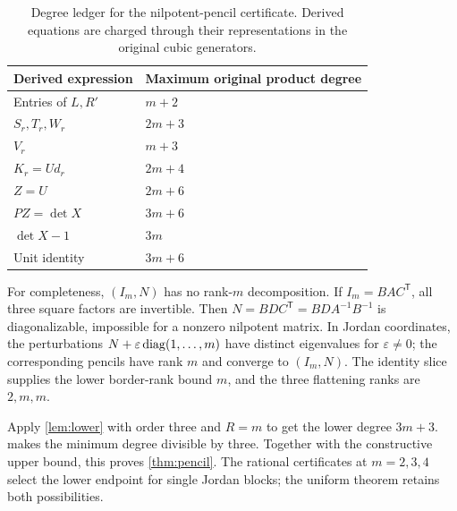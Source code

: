 \begin{table}[htbp]
\centering\small
\begin{tabular}{@{}ll@{}}
\toprule
Derived expression & Maximum original product degree \\
\midrule
Entries of $L,R'$ & $m+2$ \\
$S_r,T_r,W_r$ & $2m+3$ \\
$V_r$ & $m+3$ \\
$K_r=Ud_r$ & $2m+4$ \\
$Z=U$ & $2m+6$ \\
$PZ=\det X$ & $3m+6$ \\
$\det X-1$ & $3m$ \\
Unit identity & $3m+6$ \\
\bottomrule
\end{tabular}
\caption{Degree ledger for the nilpotent-pencil certificate. Derived equations are charged through their representations in the original cubic generators.}
\label{tab:degree-ledger}
\end{table}

For completeness, $(I_m,N)$ has no rank-$m$ decomposition. If $I_m=BAC^{\mathsf T}$, all three square factors are invertible. Then $N=BDC^{\mathsf T}=BDA^{-1}B^{-1}$ is diagonalizable, impossible for a nonzero nilpotent matrix. In Jordan coordinates, the perturbations $N+\varepsilon\operatorname{diag}(1,\ldots,m)$ have distinct eigenvalues for $\varepsilon\ne0$; the corresponding pencils have rank $m$ and converge to $(I_m,N)$. The identity slice supplies the lower border-rank bound $m$, and the three flattening ranks are $2,m,m$.

Apply \cref{lem:lower} with order three and $R=m$ to get the lower degree $3m+3$.  makes the minimum degree divisible by three. Together with the constructive upper bound, this proves \cref{thm:pencil}. The rational certificates at $m=2,3,4$ select the lower endpoint for single Jordan blocks; the uniform theorem retains both possibilities.
